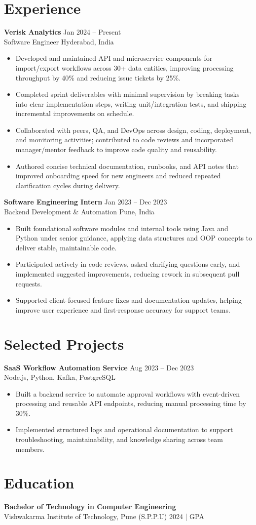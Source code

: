 \documentclass[10pt,letterpaper]{article}
\newcommand{\resumeSubheading}[4]{%
  \textbf{#1} \hfill #2 \\
  #3 \hfill #4 \\
}
\begin{document}
\section*{Experience}
\resumeSubheading{Verisk Analytics}{Jan 2024 -- Present}{Software Engineer}{Hyderabad, India}
\begin{itemize}
    \item Developed and maintained API and microservice components for import/export workflows across 30+ data entities, improving processing throughput by 40\% and reducing issue tickets by 25\%.
    \item Completed sprint deliverables with minimal supervision by breaking tasks into clear implementation steps, writing unit/integration tests, and shipping incremental improvements on schedule.
    \item Collaborated with peers, QA, and DevOps across design, coding, deployment, and monitoring activities; contributed to code reviews and incorporated manager/mentor feedback to improve code quality and reusability.
    \item Authored concise technical documentation, runbooks, and API notes that improved onboarding speed for new engineers and reduced repeated clarification cycles during delivery.
\end{itemize}

\resumeSubheading{Software Engineering Intern}{Jan 2023 -- Dec 2023}{Backend Development \& Automation}{Pune, India}
\begin{itemize}
    \item Built foundational software modules and internal tools using Java and Python under senior guidance, applying data structures and OOP concepts to deliver stable, maintainable code.
    \item Participated actively in code reviews, asked clarifying questions early, and implemented suggested improvements, reducing rework in subsequent pull requests.
    \item Supported client-focused feature fixes and documentation updates, helping improve user experience and first-response accuracy for support teams.
\end{itemize}

\section*{Selected Projects}
\resumeSubheading{SaaS Workflow Automation Service}{Aug 2023 -- Dec 2023}{}{Node.js, Python, Kafka, PostgreSQL}
\begin{itemize}
    \item Built a backend service to automate approval workflows with event-driven processing and reusable API endpoints, reducing manual processing time by 30\%.
    \item Implemented structured logs and operational documentation to support troubleshooting, maintainability, and knowledge sharing across team members.
\end{itemize}

\section*{Education}
\resumeSubheading{Bachelor of Technology in Computer Engineering}{}{Vishwakarma Institute of Technology, Pune (S.P.P.U)}{2024 \enspace | \enspace 8.8 GPA}
\end{document}
